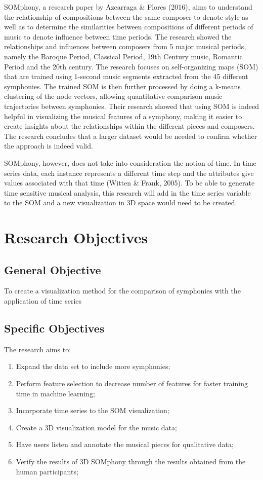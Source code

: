	SOMphony, a research paper by Azcarraga \& Flores (2016), aims to understand the relationship of compositions between the same composer to denote style as well as to determine the similarities between compositions of different periods of music to denote influence between time periods. The research showed the relationships and influences between composers from 5 major musical periods, namely the Baroque Period, Classical Period, 19th Century music, Romantic Period and the 20th century. The research focuses on self-organizing maps (SOM) that are trained using 1-second music segments extracted from the 45 different symphonies. The trained SOM is then further processed by doing a k-means clustering of the node vectors, allowing quantitative comparison music trajectories between symphonies. Their research showed that using SOM is indeed helpful in visualizing the musical features of a symphony, making it easier to create insights about the relationships within the different pieces and composers. The research concludes that a larger dataset would be needed to confirm whether the approach is indeed valid. 

	SOMphony, however, does not take into consideration the notion of time. In time series data, each instance represents a different time step and the attributes give values associated with that time (Witten  \& Frank, 2005).  To be able to generate time sensitive musical analysis, this research will add in the time series variable to the SOM and a new visualization in 3D space would need to be created.


\section{Research Objectives}
\label{sec:researchobjectives}
\subsection{General Objective}
\label{sec:generalobjective}
To create a visualization method for the comparison of symphonies with the application of time series
\subsection{Specific Objectives}
\label{sec:specificobjectives}
The research aims to:
\begin{enumerate}
\item Expand the data set to include more symphonies;
\item Perform feature selection to decrease number of features for faster training time in machine learning;
\item Incorporate time series to the SOM visualization;
\item Create a 3D visualization model for the music data;
\item Have users listen and annotate the musical pieces for qualitative data;
\item Verify the results of 3D SOMphony through the results obtained from the human participants;
\end{enumerate}
